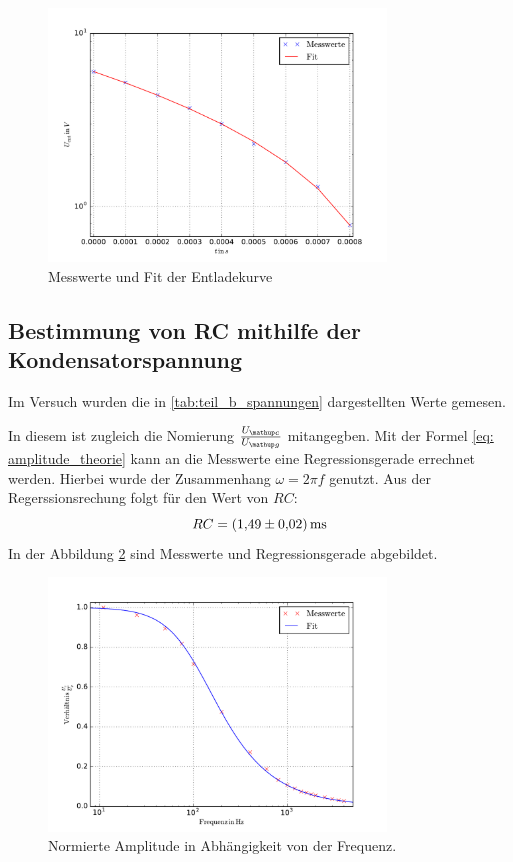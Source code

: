 \begin{figure}
  \includegraphics [width=0.8\textwidth]{pics/teil_a_entladung.pdf}
  \caption{Messwerte und Fit der Entladekurve}
  \label{fig:plot_teila}
\end{figure}

\subsection{Bestimmung von RC mithilfe der Kondensatorspannung}
Im Versuch wurden die in \ref{tab:teil_b_spannungen} dargestellten Werte gemesen.

In diesem ist zugleich die Nomierung $\frac{U\ua{c}}{U\ua{g}}$
mitangegben.
Mit der Formel \eqref{eq: amplitude_theorie} kann an die Messwerte eine Regressionsgerade
errechnet werden. Hierbei wurde der Zusammenhang $\omega=2\pi f$ genutzt.
Aus der Regerssionsrechung folgt für den Wert von $RC$:
\begin{equation}
  \label{eq:rc_teilb}
  RC=\SI{1.49\pm0.02}{\milli\second}
\end{equation}
In der Abbildung \ref{fig:teilb} sind Messwerte und Regressionsgerade abgebildet.
\begin{figure}
  \includegraphics[width=0.8\textwidth]{pics/u_cdurchu_g.pdf}
  \caption{Normierte Amplitude in Abhängigkeit von der Frequenz.}
  \label{fig:teilb}
\end{figure}

